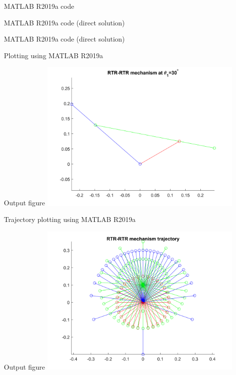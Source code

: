 \begin{frame}{MATLAB R2019a code}

\end{frame}
\begin{frame}{MATLAB R2019a code (direct solution)}
	
\end{frame}
\begin{frame}{MATLAB R2019a code (direct solution)}

\end{frame}
\begin{frame}{Plotting using MATLAB R2019a}

\end{frame}
\begin{frame}{Output figure}
\centering
\includegraphics[width=100mm]{images/RRTRRTR-plot.png}
\end{frame}
\begin{frame}{Trajectory plotting using MATLAB R2019a}

\end{frame}
\begin{frame}{Output figure}
\centering
\includegraphics[width=100mm]{images/RRTRRTR-trajectory.png}
\end{frame}
